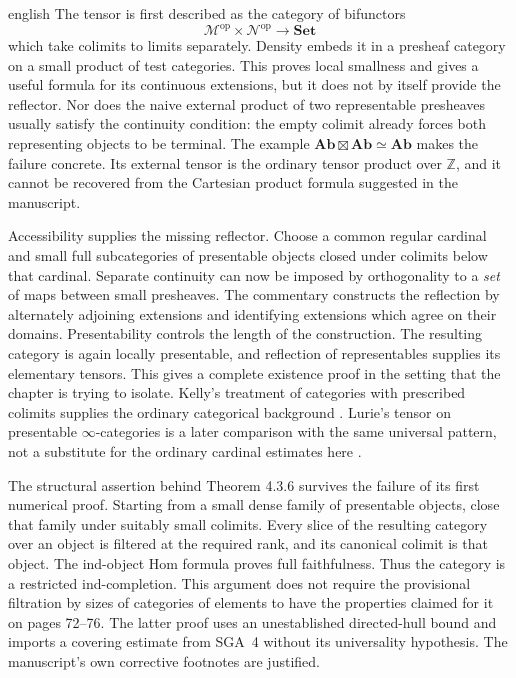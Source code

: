\begin{otherlanguage*}{english}
The tensor is first described as the category of bifunctors
\[
 \mathcal M^{\mathrm{op}}\times\mathcal N^{\mathrm{op}}
 \longrightarrow\mathbf{Set}
\]
which take colimits to limits separately. Density embeds it in a presheaf category on a small product of test categories. This proves local smallness and gives a useful formula for its continuous extensions, but it does not by itself provide the reflector. Nor does the naive external product of two representable presheaves usually satisfy the continuity condition: the empty colimit already forces both representing objects to be terminal. The example $\mathbf{Ab}\boxtimes\mathbf{Ab}\simeq\mathbf{Ab}$ makes the failure concrete. Its external tensor is the ordinary tensor product over $\mathbb Z$, and it cannot be recovered from the Cartesian product formula suggested in the manuscript.

Accessibility supplies the missing reflector. Choose a common regular cardinal and small full subcategories of presentable objects closed under colimits below that cardinal. Separate continuity can now be imposed by orthogonality to a \emph{set} of maps between small presheaves. The commentary constructs the reflection by alternately adjoining extensions and identifying extensions which agree on their domains. Presentability controls the length of the construction. The resulting category is again locally presentable, and reflection of representables supplies its elementary tensors. This gives a complete existence proof in the setting that the chapter is trying to isolate. Kelly's treatment of categories with prescribed colimits supplies the ordinary categorical background \citep[Section 6.5]{Kelly1982}. Lurie's tensor on presentable $\infty$-categories is a later comparison with the same universal pattern, not a substitute for the ordinary cardinal estimates here \citep[Section 4.8.1]{Lurie2017HA}.

The structural assertion behind Theorem 4.3.6 survives the failure of its first numerical proof. Starting from a small dense family of presentable objects, close that family under suitably small colimits. Every slice of the resulting category over an object is filtered at the required rank, and its canonical colimit is that object. The ind-object Hom formula proves full faithfulness. Thus the category is a restricted ind-completion. This argument does not require the provisional filtration by sizes of categories of elements to have the properties claimed for it on pages 72--76. The latter proof uses an unestablished directed-hull bound and imports a covering estimate from SGA~4 without its universality hypothesis. The manuscript's own corrective footnotes are justified.


\end{otherlanguage*}
